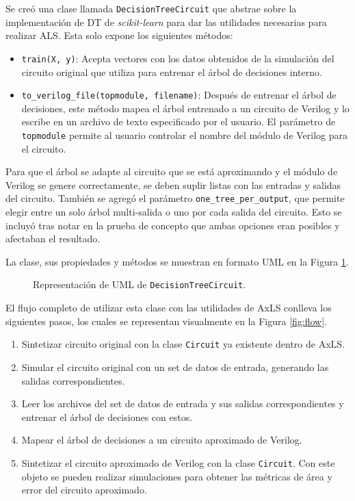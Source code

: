 Se creó una clase llamada \texttt{DecisionTreeCircuit} que abstrae sobre la
implementación de DT de \emph{scikit-learn} para dar las utilidades necesarias
para realizar ALS. Esta solo expone los siguientes métodos:

\begin{itemize}
  \item \texttt{train(X, y)}: Acepta vectores con los datos obtenidos de la
    simulación del circuito original que utiliza para entrenar el árbol de
    decisiones interno.
  \item \texttt{to\_verilog\_file(topmodule, filename)}: Después de entrenar el
    árbol de decisiones, este método mapea el árbol entrenado a un circuito de
    Verilog y lo escribe en un archivo de texto especificado por el usuario. El
    parámetro de \texttt{topmodule} permite al usuario controlar el nombre del
    módulo de Verilog para el circuito.
\end{itemize}

Para que el árbol se adapte al circuito que se está aproximando y el módulo de
Verilog se genere correctamente, se deben suplir listas con las entradas y
salidas del circuito.
También se agregó el parámetro \texttt{one\_tree\_per\_output}, que permite
elegir entre un solo árbol multi-salida o uno por cada salida del circuito.
Esto se incluyó tras notar en la prueba de concepto que ambas opciones eran
posibles y afectaban el resultado.

La clase, sus propiedades y métodos se muestran en formato UML en la Figura
\ref{fig:UML}.

\begin{figure}[htb]
  \centering
  
  \caption{Representación de UML de \texttt{DecisionTreeCircuit}.}
  \label{fig:UML}
\end{figure}

El flujo completo de utilizar esta clase con las utilidades de AxLS conlleva los siguientes pasos, los cuales se representan visualmente en la Figura \ref{fig:flow}.

\begin{enumerate}
  \item Sintetizar circuito original con la clase \texttt{Circuit} ya existente dentro de AxLS.
  \item Simular el circuito original con un set de datos de entrada, generando las salidas correspondientes.
  \item Leer los archivos del set de datos de entrada y sus salidas correspondientes y entrenar el árbol de decisiones con estos.
  \item Mapear el árbol de decisiones a un circuito aproximado de Verilog.
  \item Sintetizar el circuito aproximado de Verilog con la clase \texttt{Circuit}. Con este objeto se pueden realizar simulaciones para obtener las métricas de área y error del circuito aproximado.
\end{enumerate}

